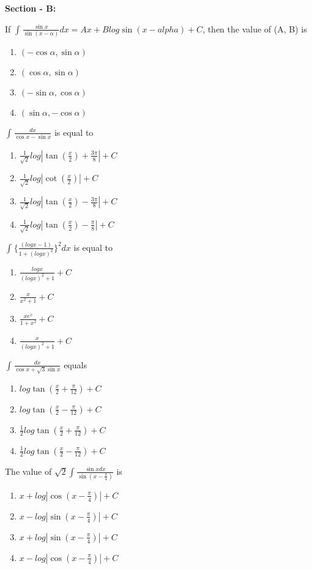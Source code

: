 \textbf{Section - B:}

\item If $\int_{}\frac{\sin x}{\sin(x - \alpha)}dx = Ax + Blog\sin(x - alpha) + C$, then the value of (A, B) is
\begin{enumerate}
\item $(-\cos\alpha, \sin\alpha)$
\item $(\cos\alpha, \sin\alpha)$
\item $(-\sin\alpha, \cos\alpha)$
\item $(\sin\alpha, -\cos\alpha)$
\end{enumerate}

\item $\int_{}\frac{dx}{\cos x - \sin x}$ is equal to
\begin{enumerate}
\item $\frac{1}{\sqrt{2}}log|\tan(\frac{x}{2}) + \frac{3\pi}{8}| + C$
\item $\frac{1}{\sqrt{2}}log|\cot(\frac{x}{2})| + C$
\item $\frac{1}{\sqrt{2}}log|\tan(\frac{x}{2}) - \frac{3\pi}{8}| + C$
\item $\frac{1}{\sqrt{2}}log|\tan(\frac{x}{2}) - \frac{\pi}{8}| + C$
\end{enumerate}

\item $\int_{}\{\frac{(logx - 1)}{1 + (logx)^2}\}^2dx$ is equal to
\begin{enumerate}
\item $\frac{logx}{(logx)^2 + 1} + C$
\item $\frac{x}{x^2 + 1} + C$
\item $\frac{xe^x}{1 + x^2} + C$
\item $\frac{x}{(logx)^2 + 1} + C$
\end{enumerate} 

\item $\int_{}\frac{dx}{\cos x + \sqrt{3}\sin x}$ equals
\begin{enumerate}
\item $log \tan(\frac{x}{2} + \frac{\pi}{12}) + C$
\item $log \tan(\frac{x}{2} - \frac{\pi}{12}) + C$
\item $\frac{1}{2}log \tan(\frac{x}{2} + \frac{\pi}{12}) + C$
\item $\frac{1}{2}log \tan(\frac{x}{2} - \frac{\pi}{12}) + C$
\end{enumerate}

\item The value of $\sqrt{2}\int_{}\frac{\sin xdx}{\sin(x - \frac{\pi}{4})}$ is
\begin{enumerate}
\item $x+log|\cos(x - \frac{\pi}{4})| + C$
\item $x-log|\sin(x - \frac{\pi}{4})| + C$
\item $x+log|\sin(x - \frac{\pi}{4})| + C$
\item $x-log|\cos(x - \frac{\pi}{4})| + C$
\end{enumerate}

